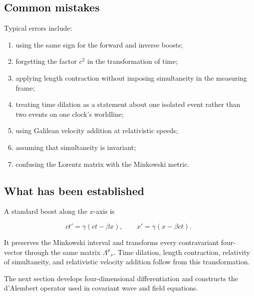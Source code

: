 \subsection{Common mistakes}

Typical errors include:

\begin{enumerate}
    \item using the same sign for the forward and inverse boosts;
    \item forgetting the factor \(c^{2}\) in the transformation of time;
    \item applying length contraction without imposing simultaneity in the measuring frame;
    \item treating time dilation as a statement about one isolated event rather than two events on one clock's worldline;
    \item using Galilean velocity addition at relativistic speeds;
    \item assuming that simultaneity is invariant;
    \item confusing the Lorentz matrix with the Minkowski metric.
\end{enumerate}

\subsection{What has been established}

A standard boost along the \(x\)-axis is

\[
ct'=\gamma(ct-\beta x),
\qquad
x'=\gamma(x-\beta ct).
\]

It preserves the Minkowski interval and transforms every contravariant four-vector through the same matrix \(\Lambda^{\mu}{}_{\nu}\). Time dilation, length contraction, relativity of simultaneity, and relativistic velocity addition follow from this transformation.

The next section develops four-dimensional differentiation and constructs the d'Alembert operator used in covariant wave and field equations.